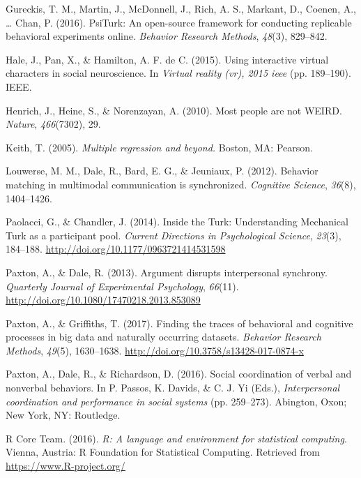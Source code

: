 \documentclass[10pt, letterpaper]{article}
\begin{document}
\hypertarget{ref-gureckis2016psiturk}{}
Gureckis, T. M., Martin, J., McDonnell, J., Rich, A. S., Markant, D.,
Coenen, A., \ldots{} Chan, P. (2016). PsiTurk: An open-source framework
for conducting replicable behavioral experiments online. \emph{Behavior
Research Methods}, \emph{48}(3), 829--842.

\hypertarget{ref-hale2015using}{}
Hale, J., Pan, X., \& Hamilton, A. F. de C. (2015). Using interactive
virtual characters in social neuroscience. In \emph{Virtual reality
(vr), 2015 ieee} (pp. 189--190). IEEE.

\hypertarget{ref-henrich2010most}{}
Henrich, J., Heine, S., \& Norenzayan, A. (2010). Most people are not
WEIRD. \emph{Nature}, \emph{466}(7302), 29.

\hypertarget{ref-keith2005multiple}{}
Keith, T. (2005). \emph{Multiple regression and beyond.} Boston, MA:
Pearson.

\hypertarget{ref-louwerse2012behavior}{}
Louwerse, M. M., Dale, R., Bard, E. G., \& Jeuniaux, P. (2012). Behavior
matching in multimodal communication is synchronized. \emph{Cognitive
Science}, \emph{36}(8), 1404--1426.

\hypertarget{ref-paolacci2014inside}{}
Paolacci, G., \& Chandler, J. (2014). Inside the Turk: Understanding
Mechanical Turk as a participant pool. \emph{Current Directions in
Psychological Science}, \emph{23}(3), 184--188.
\url{http://doi.org/10.1177/0963721414531598}

\hypertarget{ref-paxton2013argument}{}
Paxton, A., \& Dale, R. (2013). Argument disrupts interpersonal
synchrony. \emph{Quarterly Journal of Experimental Psychology},
\emph{66}(11). \url{http://doi.org/10.1080/17470218.2013.853089}

\hypertarget{ref-paxton2017finding}{}
Paxton, A., \& Griffiths, T. (2017). Finding the traces of behavioral
and cognitive processes in big data and naturally occurring datasets.
\emph{Behavior Research Methods}, \emph{49}(5), 1630--1638.
\url{http://doi.org/10.3758/s13428-017-0874-x}

\hypertarget{ref-paxton2016social}{}
Paxton, A., Dale, R., \& Richardson, D. (2016). Social coordination of
verbal and nonverbal behaviors. In P. Passos, K. Davids, \& C. J. Yi
(Eds.), \emph{Interpersonal coordination and performance in social
systems} (pp. 259--273). Abington, Oxon; New York, NY: Routledge.

\hypertarget{ref-r2016r}{}
R Core Team. (2016). \emph{R: A language and environment for statistical
computing}. Vienna, Austria: R Foundation for Statistical Computing.
Retrieved from \url{https://www.R-project.org/}
\end{document}

